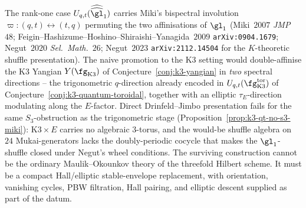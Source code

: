 The rank-one case $U_{q, t}(\widehat{\widehat{\gl}}_1)$ carries Miki's
bispectral involution $\varpi \colon (q, t) \leftrightarrow (t, q)$
permuting the two affinisations of $\gl_1$ (Miki~$2007$ \emph{JMP}~$48$;
Feigin--Hashizume--Hoshino--Shiraishi--Yanagida~$2009$
\texttt{arXiv:0904.1679}; Negut~$2020$ \emph{Sel.~Math.}~$26$;
Negut~$2023$ \texttt{arXiv:2112.14504} for the $K$-theoretic shuffle
presentation). The naive promotion to the K3 setting would
double-affinise the K3 Yangian $Y(\fg_{\mathrm{K3}})$ of
Conjecture~\ref{conj:k3-yangian} in \emph{two} spectral directions --
the trigonometric $q$-direction already encoded in
$U_{q, t}(\fg_{\mathrm K3}^{\mathrm{tor}})$ of
Conjecture~\ref{conj:k3-quantum-toroidal}, together with an elliptic
$\tau_E$-direction modulating along the $E$-factor. Direct
Drinfeld--Jimbo presentation fails for the same $S_3$-obstruction as
the trigonometric stage (Proposition~\ref{prop:k3-qt-no-s3-miki}):
$\mathrm K3 \times E$ carries no algebraic $3$-torus, and the would-be
shuffle algebra on $24$ Mukai-generators lacks the doubly-periodic
cocycle that makes the $\gl_1$-shuffle closed under Negut's wheel
conditions. The surviving construction cannot be the ordinary
Maulik--Okounkov theory of the threefold Hilbert scheme. It must be a
compact Hall/elliptic stable-envelope replacement, with orientation,
vanishing cycles, PBW filtration, Hall pairing, and elliptic descent
supplied as part of the datum.

